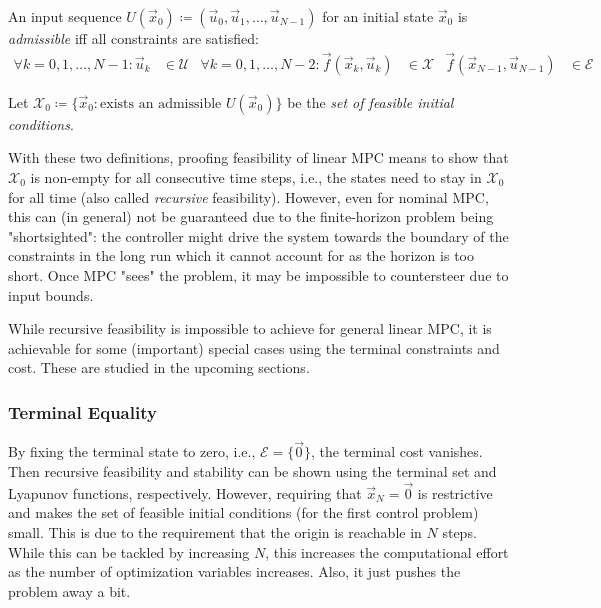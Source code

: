 			\begin{definition}
				An input sequence \( U(\vec{x}_0) \coloneqq (\vec{u}_0, \vec{u}_1, \dots, \vec{u}_{N - 1}) \) for an initial state \(\vec{x}_0\) is \emph{admissible} iff all constraints are satisfied:
				\begin{align}
					\forall k = 0, 1, \dots, N - 1 : \vec{u}_k                     & \in \mathcal{U} &
					\forall k = 0, 1, \dots, N - 2 : \vec{f}(\vec{x}_k, \vec{u}_k) & \in \mathcal{X} &
					\vec{f}(\vec{x}_{N - 1}, \vec{u}_{N - 1})                      & \in \mathcal{E}
				\end{align}
			\end{definition}
			\begin{definition}
				Let \( \mathcal{X}_0 \coloneqq \bigl\{ \vec{x}_0 : \text{exists an admissible }U(\vec{x}_0) \bigr\} \) be the \emph{set of feasible initial conditions}.
			\end{definition}

			With these two definitions, proofing feasibility of linear MPC means to show that \(\mathcal{X}_0\) is non-empty for all consecutive time steps, i.e., the states need to stay in \(\mathcal{X}_0\) for all time (also called \emph{recursive} feasibility). However, even for nominal MPC, this can (in general) not be guaranteed due to the finite-horizon problem being "shortsighted": the controller might drive the system towards the boundary of the constraints in the long run which it cannot account for as the horizon is too short. Once MPC "sees" the problem, it may be impossible to countersteer due to input bounds.

			While recursive feasibility is impossible to achieve for general linear MPC, it is achievable for some (important) special cases using the terminal constraints and cost. These are studied in the upcoming sections.

			\subsubsection{Terminal Equality}
				By fixing the terminal state to zero, i.e., \( \mathcal{E} = \{ \vec{0} \} \), the terminal cost vanishes. Then recursive feasibility and stability can be shown using the terminal set and Lyapunov functions, respectively. However, requiring that \( \vec{x}_N = \vec{0} \) is restrictive and makes the set of feasible initial conditions (for the first control problem) small. This is due to the requirement that the origin is reachable in \(N\) steps. While this can be tackled by increasing \(N\), this increases the computational effort as the number of optimization variables increases. Also, it just pushes the problem away a bit.


